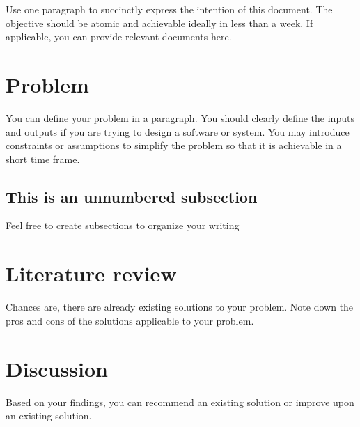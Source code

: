 Use one paragraph to succinctly express the intention of this document. The objective should be atomic and achievable ideally in less than a week. If applicable, you can provide relevant documents here. 
\section{Problem}
You can define your problem in a paragraph. You should clearly define the inputs and outputs if you are trying to design a software or system. You may introduce constraints or assumptions to simplify the problem so that it is achievable in a short time frame. 
\subsection*{This is an unnumbered subsection}
Feel free to create subsections to organize your writing

\section{Literature review}
Chances are, there are already existing solutions to your problem. Note down the pros and cons of the solutions applicable to your problem.

\section{Discussion}
Based on your findings, you can recommend an existing solution or improve upon an existing solution.